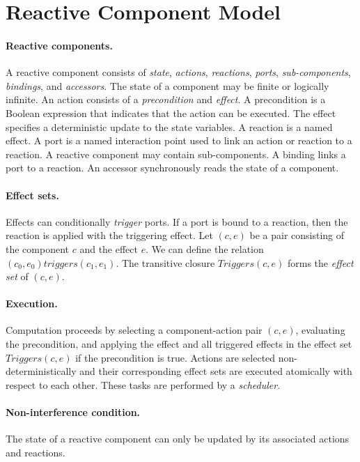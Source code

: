\section{Reactive Component Model\label{model}}

\paragraph{Reactive components.}
A reactive component consists of \emph{state}, \emph{actions}, \emph{reactions}, \emph{ports}, \emph{sub-components}, \emph{bindings}, and \emph{accessors}.
The state of a component may be finite or logically infinite.
An action consists of a \emph{precondition} and \emph{effect}.
A precondition is a Boolean expression that indicates that the action can be executed.
The effect specifies a deterministic update to the state variables.
A reaction is a named effect.
A port is a named interaction point used to link an action or reaction to a reaction.
A reactive component may contain sub-components.
A binding links a port to a reaction.
An accessor synchronously reads the state of a component.

\paragraph{Effect sets.}
Effects can conditionally \emph{trigger} ports.
If a port is bound to a reaction, then the reaction is applied with the triggering effect.
Let $(c,e)$ be a pair consisting of the component $c$ and the effect $e$.
We can define the relation $(c_0, e_0) triggers (c_1, e_1)$.
The transitive closure $Triggers(c,e)$ forms the \emph{effect set} of $(c,e)$.

\paragraph{Execution.}
Computation proceeds by selecting a component-action pair $(c,e)$, evaluating the precondition, and applying the effect and all triggered effects in the effect set $Triggers(c,e)$ if the precondition is true.
Actions are selected non-deterministically and their corresponding effect sets are executed atomically with respect to each other.
These tasks are performed by a \emph{scheduler}.

\paragraph{Non-interference condition.}
The state of a reactive component can only be updated by its associated actions and reactions.

